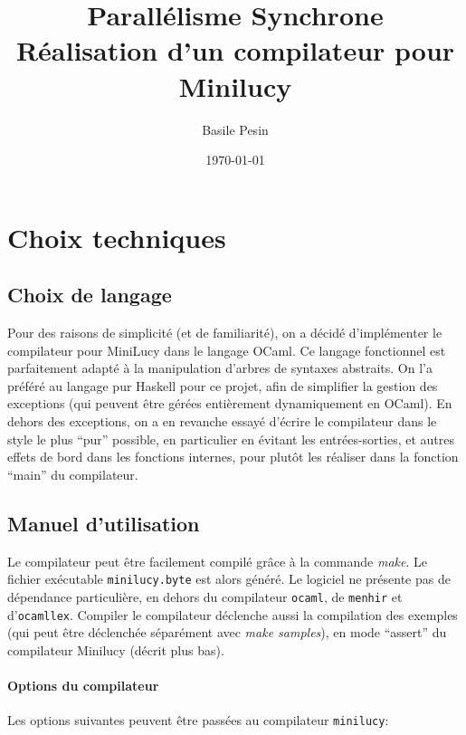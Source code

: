\documentclass{article}
\title{Parallélisme Synchrone\\ Réalisation d'un compilateur pour Minilucy}
\author{Basile Pesin}
\date{\today}
\begin{document}
\maketitle

\section{Choix techniques}

\subsection{Choix de langage}

Pour des raisons de simplicité (et de familiarité), on a décidé d'implémenter le compilateur pour MiniLucy dans le langage OCaml. Ce langage fonctionnel est parfaitement adapté à la manipulation d'arbres de syntaxes abstraits. On l'a préféré au langage pur Haskell pour ce projet, afin de simplifier la gestion des exceptions (qui peuvent être gérées entièrement dynamiquement en OCaml). En dehors des exceptions, on a en revanche essayé d'écrire le compilateur dans le style le plus ``pur'' possible, en particulier en évitant les entrées-sorties, et autres effets de bord dans les fonctions internes, pour plutôt les réaliser dans la fonction ``main'' du compilateur.

\subsection{Manuel d'utilisation}

Le compilateur peut être facilement compilé grâce à la commande \textit{make}. Le fichier exécutable \texttt{minilucy.byte} est alors généré. Le logiciel ne présente pas de dépendance particulière, en dehors du compilateur \texttt{ocaml}, de \texttt{menhir} et d'\texttt{ocamllex}. Compiler le compilateur déclenche aussi la compilation des exemples (qui peut être déclenchée séparément avec \textit{make samples}), en mode ``assert'' du compilateur Minilucy (décrit plus bas).

\paragraph{Options du compilateur}

Les options suivantes peuvent être passées au compilateur \texttt{minilucy}:
\end{document}
